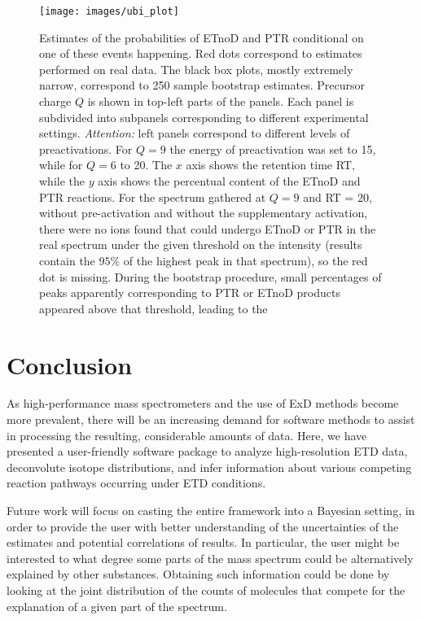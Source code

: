 \documentclass[journal=ancham, manuscript=article, layout=twocolumn]{achemso}
\begin{document}
\begin{figure*}[t]    
	\centering
    \texttt{[image: images/ubi\_plot]}
    \caption{Estimates of the probabilities of ETnoD and PTR conditional on one of these events happening. Red dots correspond to estimates performed on real data. The black box plots, mostly extremely narrow, correspond to 250 sample bootstrap estimates. Precursor charge $Q$ is shown in top-left parts of the panels. Each panel is subdivided into subpanels corresponding to different experimental settings. \textit{Attention:} left panels correspond to different levels of preactivations. For $Q=9$ the energy of preactivation was set to 15, while for $Q = 6$ to 20. The $x$ axis shows the retention time RT, while the $y$ axis shows the percentual content of the ETnoD and PTR reactions. 
    For the spectrum gathered at $Q=9$ and RT = 20, without pre-activation and without the supplementary activation, there were no ions found that could undergo ETnoD or PTR in the real spectrum under the given threshold on the intensity (results contain the $95\%$ of the highest peak in that spectrum), so the red dot is missing. 
    During the bootstrap procedure, small percentages of peaks apparently corresponding to PTR or ETnoD products appeared above that threshold, leading to the 
    }\label{fig::ubi wall}
\end{figure*}


\section{Conclusion}
As high-performance mass spectrometers and the use of ExD methods become more prevalent, there will be an increasing demand for software methods to assist in processing the resulting, considerable amounts of data. 
Here, we have presented a user-friendly software package to analyze high-resolution ETD data, deconvolute isotope distributions, and infer information about various competing reaction pathways occurring under ETD conditions. 

Future work will focus on casting the entire framework into a Bayesian setting, in order to provide the user with better understanding of the uncertainties of the estimates and potential correlations of results. 
In particular, the user might be interested to what degree some parts of the mass spectrum could be alternatively explained by other substances. 
Obtaining such information could be done by looking at the joint distribution of the counts of molecules that compete for the explanation of a given part of the spectrum.
\end{document}

